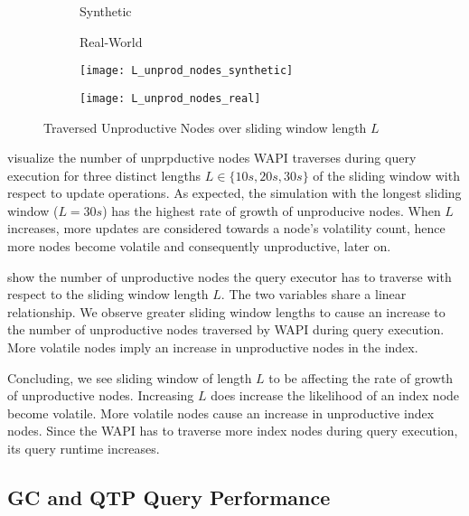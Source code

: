 \documentclass[abstracton,12pt]{scrartcl}
\theoremstyle{definition}
\begin{document}
\begin{figure}[h]
  \centering
  \begin{subfigure}{0.49\linewidth}
    \centering
    Synthetic
  \end{subfigure}
  \begin{subfigure}{0.49\linewidth}
    \centering
    Real-World
  \end{subfigure}
  \begin{subfigure}{0.49\linewidth}
    \centering
    \texttt{[image: L\_unprod\_nodes\_synthetic]}
    \caption{}
    \label{fig:L_trav_unprod_nodes_synthetic}
  \end{subfigure}
  \begin{subfigure}{0.49\linewidth}
    \centering
    \texttt{[image: L\_unprod\_nodes\_real]}
    \caption{}
    \label{fig:L_trav_unprod_nodes_real}
  \end{subfigure}
  \caption{Traversed Unproductive Nodes over sliding window length $L$}
\end{figure}

 visualize
the number of unprpductive nodes WAPI traverses during query execution for
three distinct lengths $L \in \{10s,20s,30s\}$ of the sliding window with
respect to update operations. As expected, the simulation with the longest
sliding window ($L = 30s$) has the highest rate of growth of unproducive nodes.
When $L$ increases, more updates are considered towards a node's volatility count,
hence more nodes become volatile and consequently unproductive, later on.

 show the
number of unproductive nodes the query executor has to traverse with respect
to the sliding window length $L$. The two variables share a linear relationship.
We observe greater sliding window lengths to cause an increase to the
number of unproductive nodes traversed by WAPI during query execution.
More volatile nodes imply an increase in unproductive nodes in the index.

Concluding, we see sliding window of length $L$ to be affecting the rate of growth of
unproductive nodes.
Increasing $L$ does increase the likelihood of an index node become volatile.
More volatile nodes cause an increase in unproductive index nodes. Since the
WAPI has to traverse more index nodes during query execution, its query runtime
increases.

\subsection{GC and QTP Query Performance}
\end{document}
